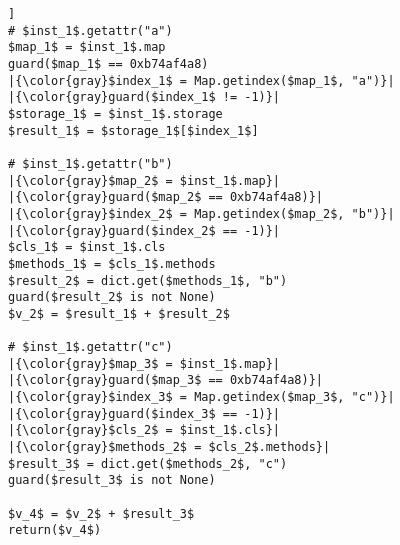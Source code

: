\begin{lstlisting}[mathescape,escapechar=|,basicstyle=\ttfamily]]
# $inst_1$.getattr("a")
$map_1$ = $inst_1$.map
guard($map_1$ == 0xb74af4a8)
|{\color{gray}$index_1$ = Map.getindex($map_1$, "a")}|
|{\color{gray}guard($index_1$ != -1)}|
$storage_1$ = $inst_1$.storage
$result_1$ = $storage_1$[$index_1$]

# $inst_1$.getattr("b")
|{\color{gray}$map_2$ = $inst_1$.map}|
|{\color{gray}guard($map_2$ == 0xb74af4a8)}|
|{\color{gray}$index_2$ = Map.getindex($map_2$, "b")}|
|{\color{gray}guard($index_2$ == -1)}|
$cls_1$ = $inst_1$.cls
$methods_1$ = $cls_1$.methods
$result_2$ = dict.get($methods_1$, "b")
guard($result_2$ is not None)
$v_2$ = $result_1$ + $result_2$

# $inst_1$.getattr("c")
|{\color{gray}$map_3$ = $inst_1$.map}|
|{\color{gray}guard($map_3$ == 0xb74af4a8)}|
|{\color{gray}$index_3$ = Map.getindex($map_3$, "c")}|
|{\color{gray}guard($index_3$ == -1)}|
|{\color{gray}$cls_2$ = $inst_1$.cls}|
|{\color{gray}$methods_2$ = $cls_2$.methods}|
$result_3$ = dict.get($methods_2$, "c")
guard($result_3$ is not None)

$v_4$ = $v_2$ + $result_3$
return($v_4$)
\end{lstlisting}
